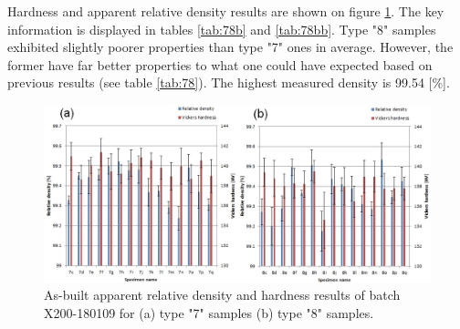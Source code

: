 Hardness and apparent relative density results are shown on figure \ref{fig:HD-171024}. The key information is displayed in tables \ref{tab:78b} and \ref{tab:78bb}. Type "8" samples exhibited slightly poorer properties than type "7" ones in average. However, the former have far better properties to what one could have expected based on previous results (see table \ref{tab:78}). The highest measured density is 99.54 [\%].\\

\begin{figure}[ht]
\centering
\centerline{\includegraphics[scale=0.65]{Images/HD-180109-both}}
\decoRule
\caption[As-built apparent relative density and hardness results of batch X200-180109 for (a) type "7" samples (b) type "8" samples.]{As-built apparent relative density and hardness results of batch X200-180109 for (a) type "7" samples (b) type "8" samples.}
\label{fig:HD-171024}
\end{figure} 

 \begin{center}
\begin{table}[ht]
\noindent{}

\caption[Standard deviations and average values for apparent relative densities and hardnesses of types "7" and "8" specimens of batch X200-180109]{Standard deviations and average values for apparent relative densities and hardnesses of types "7" and "8" specimens of batch X200-180109}
\label{tab:78b}
\end{table}
 \end{center}
 
